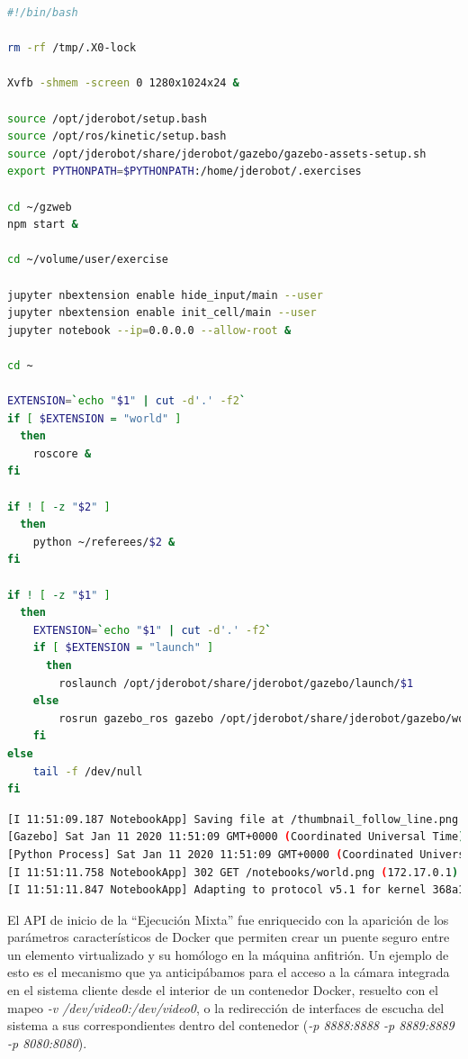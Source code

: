 \begin{lstlisting}[language=bash, caption=Código de Inicio del Secuenciador]
#!/bin/bash

rm -rf /tmp/.X0-lock

Xvfb -shmem -screen 0 1280x1024x24 &

source /opt/jderobot/setup.bash
source /opt/ros/kinetic/setup.bash
source /opt/jderobot/share/jderobot/gazebo/gazebo-assets-setup.sh
export PYTHONPATH=$PYTHONPATH:/home/jderobot/.exercises

cd ~/gzweb
npm start &

cd ~/volume/user/exercise

jupyter nbextension enable hide_input/main --user
jupyter nbextension enable init_cell/main --user
jupyter notebook --ip=0.0.0.0 --allow-root &

cd ~

EXTENSION=`echo "$1" | cut -d'.' -f2`
if [ $EXTENSION = "world" ]
  then
    roscore &
fi

if ! [ -z "$2" ]
  then
    python ~/referees/$2 &
fi

if ! [ -z "$1" ]
  then
    EXTENSION=`echo "$1" | cut -d'.' -f2`
    if [ $EXTENSION = "launch" ]
      then
        roslaunch /opt/jderobot/share/jderobot/gazebo/launch/$1
    else
        rosrun gazebo_ros gazebo /opt/jderobot/share/jderobot/gazebo/worlds/$1
    fi
else
    tail -f /dev/null
fi
\end{lstlisting}
\begin{lstlisting}[language=bash, caption=Reenvío de Mensajes]
[I 11:51:09.187 NotebookApp] Saving file at /thumbnail_follow_line.png
[Gazebo] Sat Jan 11 2020 11:51:09 GMT+0000 (Coordinated Universal Time) Received Message: {"op":"advertise","id":"advertise:~/heartbeat:14","type":"heartbeat","topic":"~/heartbeat"} from http://127.0.0.1:8080 ::ffff:172.17.0.1
[Python Process] Sat Jan 11 2020 11:51:09 GMT+0000 (Coordinated Universal Time) Received Message: {"op":"publish","id":"publish:~/heartbeat:15","topic":"~/heartbeat","msg":{"alive":1}} from http://127.0.0.1:8080 ::ffff:172.17.0.1
[I 11:51:11.758 NotebookApp] 302 GET /notebooks/world.png (172.17.0.1) 0.95ms
[I 11:51:11.847 NotebookApp] Adapting to protocol v5.1 for kernel 368a1e46-acc2-4976-acf3-25528ae77d77
\end{lstlisting}

El API de inicio de la ``Ejecución Mixta'' fue enriquecido con la aparición de los parámetros característicos de Docker que permiten crear un puente seguro entre un elemento virtualizado y su homólogo en la máquina anfitrión. Un ejemplo de esto es el mecanismo que ya anticipábamos para el acceso a la cámara integrada en el sistema cliente desde el interior de un contenedor Docker, resuelto con el mapeo \textit{-v /dev/video0:/dev/video0}, o la redirección de interfaces de escucha del sistema a sus correspondientes dentro del contenedor (\textit{-p 8888:8888 -p 8889:8889 -p 8080:8080}).

